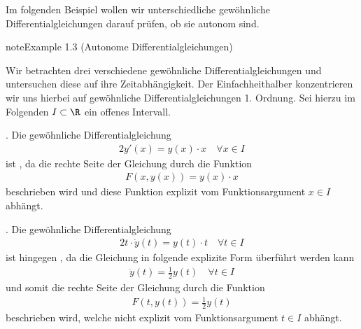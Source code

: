\documentclass[letterpaper,10pt,english]{jupyterBook}
\begin{document}
\sphinxAtStartPar
Im folgenden Beispiel wollen wir unterschiedliche gewöhnliche Differentialgleichungen darauf prüfen, ob sie autonom sind.
\label{ode/repetition:example-4}
\begin{sphinxadmonition}{note}{Example 1.3 (Autonome Differentialgleichungen)}



\sphinxAtStartPar
Wir betrachten drei verschiedene gewöhnliche Differentialgleichungen und untersuchen diese auf ihre Zeitabhängigkeit.
Der Einfachheit\sphinxhyphen{}halber konzentrieren wir uns hierbei auf gewöhnliche Differentialgleichungen 1. Ordnung.
Sei hierzu  im Folgenden \(I \subset \R\) ein offenes Intervall.

. Die gewöhnliche Differentialgleichung
\begin{equation*}
\begin{split}2y'(x) = y(x)\cdot x \quad \forall x \in I\end{split}
\end{equation*}
\sphinxAtStartPar
ist , da die rechte Seite der Gleichung durch die Funktion
\begin{equation*}
\begin{split}F(x,y(x)) = y(x) \cdot x\end{split}
\end{equation*}
\sphinxAtStartPar
beschrieben wird und diese Funktion explizit vom Funktionsargument \(x \in I\) abhängt.



. Die gewöhnliche Differentialgleichung
\begin{equation*}
\begin{split}2t\cdot \dot{y}(t) = y(t)\cdot t \quad \forall t \in I\end{split}
\end{equation*}
\sphinxAtStartPar
ist hingegen , da die Gleichung in folgende explizite Form überführt werden kann
\begin{equation*}
\begin{split}\dot{y}(t) = \frac{1}{2} y(t) \quad \forall t \in I\end{split}
\end{equation*}
\sphinxAtStartPar
und somit die rechte Seite der Gleichung durch die Funktion
\begin{equation*}
\begin{split}F(t,y(t)) = \frac{1}{2}y(t)\end{split}
\end{equation*}
\sphinxAtStartPar
beschrieben wird, welche nicht explizit vom Funktionsargument \(t \in I\) abhängt.




\end{sphinxadmonition}
\end{document}
